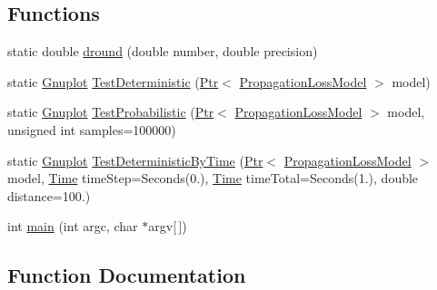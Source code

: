 \subsection*{Functions}
\begin{DoxyCompactItemize}
\item 
static double \hyperlink{main-propagation-loss_8cc_a721898091040fc1467f1dca3e57edd12}{dround} (double number, double precision)
\item 
static \hyperlink{classns3_1_1Gnuplot}{Gnuplot} \hyperlink{main-propagation-loss_8cc_a4e5137292d7c72e9726190680c642e7d}{Test\+Deterministic} (\hyperlink{classns3_1_1Ptr}{Ptr}$<$ \hyperlink{classns3_1_1PropagationLossModel}{Propagation\+Loss\+Model} $>$ model)
\item 
static \hyperlink{classns3_1_1Gnuplot}{Gnuplot} \hyperlink{main-propagation-loss_8cc_a2c280e21b5e273cca8f71b0f167e034f}{Test\+Probabilistic} (\hyperlink{classns3_1_1Ptr}{Ptr}$<$ \hyperlink{classns3_1_1PropagationLossModel}{Propagation\+Loss\+Model} $>$ model, unsigned int samples=100000)
\item 
static \hyperlink{classns3_1_1Gnuplot}{Gnuplot} \hyperlink{main-propagation-loss_8cc_a093207d9d8a33b2bfc987434a52eeecc}{Test\+Deterministic\+By\+Time} (\hyperlink{classns3_1_1Ptr}{Ptr}$<$ \hyperlink{classns3_1_1PropagationLossModel}{Propagation\+Loss\+Model} $>$ model, \hyperlink{classns3_1_1Time}{Time} time\+Step=Seconds(0.), \hyperlink{classns3_1_1Time}{Time} time\+Total=Seconds(1.), double distance=100.)
\item 
int \hyperlink{main-propagation-loss_8cc_a0ddf1224851353fc92bfbff6f499fa97}{main} (int argc, char $\ast$argv\mbox{[}$\,$\mbox{]})
\end{DoxyCompactItemize}


\subsection{Function Documentation}
